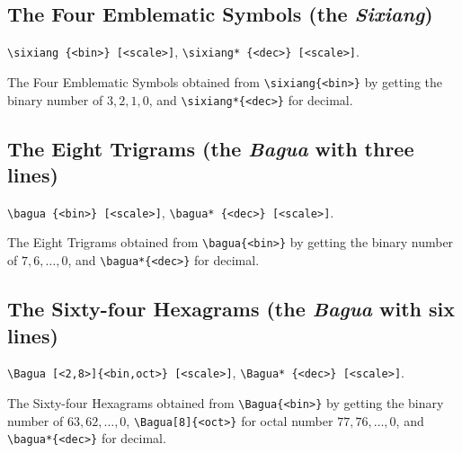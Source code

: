 \documentclass{article}
\begin{document}
\subsection{The Four Emblematic Symbols (the \emph{Sixiang})}
\verb+\sixiang {<bin>} [<scale>]+, \verb+\sixiang* {<dec>} [<scale>]+.

The Four Emblematic Symbols obtained from \verb+\sixiang{<bin>}+ by getting the binary number of $3,2,1,0$, and \verb+\sixiang*{<dec>}+ for decimal.

\begin{center}
\end{center}

\subsection{The Eight Trigrams (the \emph{Bagua} with three lines)}
\verb+\bagua {<bin>} [<scale>]+, \verb+\bagua* {<dec>} [<scale>]+.

The Eight Trigrams obtained from \verb+\bagua{<bin>}+ by getting the binary number of $7,6,\dots,0$, and \verb+\bagua*{<dec>}+ for decimal.

\begin{center}
\end{center}

\subsection{The Sixty-four Hexagrams (the \emph{Bagua} with six lines)}
\verb+\Bagua [<2,8>]{<bin,oct>} [<scale>]+, \verb+\Bagua* {<dec>} [<scale>]+.

The Sixty-four Hexagrams obtained from \verb+\Bagua{<bin>}+ by getting the binary number of $63,62,\dots,0$, \verb+\Bagua[8]{<oct>}+ for octal number $77,76,\dots,0$, and \verb+\bagua*{<dec>}+ for decimal.
\end{document}
